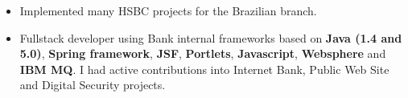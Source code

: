 \documentclass[10pt,a4paper,ragged2e,withhyper]{altacv}
\begin{document}
\begin{paracol}{2}
\divider


\begin{itemize}
\item Implemented many HSBC projects for the Brazilian branch.
\item Fullstack developer using Bank internal frameworks based on \textbf{Java (1.4 and 5.0)}, \textbf{Spring framework}, \textbf{JSF}, \textbf{Portlets}, \textbf{Javascript}, \textbf{Websphere} and \textbf{IBM MQ}. I had active contributions into Internet Bank, Public Web Site and Digital Security projects.
\end{itemize}






\newpage




\end{paracol}
\end{document}
